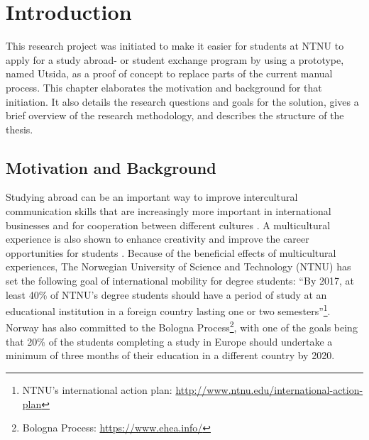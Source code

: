 
\chapter{Introduction}\label{chap:1}

This research project was initiated to make it easier for students at NTNU to apply for a study abroad- or student exchange program by using a prototype, named Utsida, as a proof of concept to replace parts of the current manual process. This chapter elaborates the motivation and background for that initiation. It also details the research questions and goals for the solution, gives a brief overview of the research methodology, and describes the structure of the thesis.

\section{Motivation and Background}
Studying abroad can be an important way to improve intercultural communication skills that are increasingly more important in international businesses and for cooperation between different cultures \cite{williams2005exploring}. A multicultural experience is also shown to enhance creativity \cite{leung2008multicultural} and improve the career opportunities for students \cite{brandenburg2014erasmus}. Because of the beneficial effects of multicultural experiences, The Norwegian University of Science and Technology (NTNU) has set the following goal of international mobility for degree students: \enquote{By 2017, at least 40\% of NTNU's degree students should have a period of study at an educational institution in a foreign country lasting one or two semesters}\footnote{NTNU's international action plan: \url{http://www.ntnu.edu/international-action-plan}}. Norway has also committed to the Bologna Process\footnote{Bologna Process: \url{https://www.ehea.info/}}, with one of the goals being that 20\% of the students completing a study in Europe should undertake a minimum of three months of their education in a different country by 2020.

